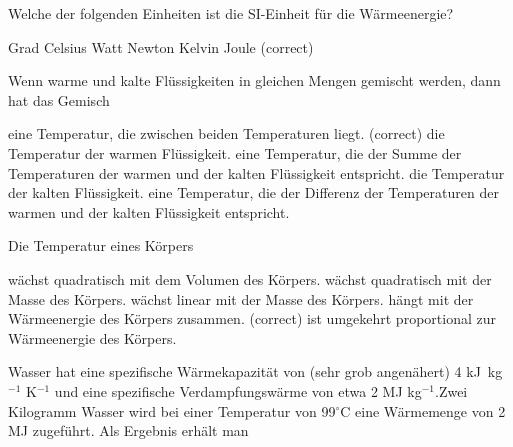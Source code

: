 \documentclass[11pt]{exam}
\begin{document}
\setlength{\voffset}{-0.5in}
\setlength{\headsep}{5pt}

\hspace{2mm}
 \hspace{5mm}
\vspace{4mm}

\begin{questions}

\question Welche der folgenden Einheiten ist die SI-Einheit für die Wärmeenergie?

\begin{choices}
	\choice Grad Celsius
	\choice Watt
	\choice Newton
	\choice Kelvin
	\choice Joule (correct)
\end{choices}

\vspace{3mm}\question Wenn warme und kalte Flüssigkeiten in gleichen Mengen gemischt werden, dann hat das Gemisch

\begin{choices}
	\choice eine Temperatur, die zwischen beiden Temperaturen liegt. (correct)
	\choice die Temperatur der warmen Flüssigkeit.
	\choice eine Temperatur, die der Summe der Temperaturen der warmen und der kalten Flüssigkeit entspricht.
	\choice die Temperatur der kalten Flüssigkeit.
	\choice eine Temperatur, die der Differenz der Temperaturen der warmen und der kalten Flüssigkeit entspricht.
\end{choices}

\vspace{3mm}\question Die Temperatur eines Körpers

\begin{choices}
	\choice wächst quadratisch mit dem Volumen des Körpers.
	\choice wächst quadratisch mit der Masse des Körpers.
	\choice wächst linear mit der Masse des Körpers.
	\choice hängt mit der Wärmeenergie des Körpers zusammen. (correct)
	\choice ist umgekehrt proportional zur Wärmeenergie des Körpers.
\end{choices}

\vspace{3mm}\question Wasser hat eine spezifische Wärmekapazität von (sehr grob angenähert) 4 kJ kg\(^{-1}\) K\(^{-1}\) und eine spezifische Verdampfungswärme von etwa 2 MJ kg\(^{-1}\).Zwei Kilogramm Wasser wird bei einer Temperatur von 99\(^\circ\)C eine Wärmemenge von 2 MJ zugeführt. Als Ergebnis erhält man


\end{questions}
\end{document}
